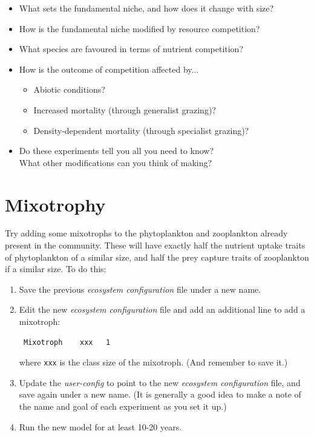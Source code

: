 \begin{itemize}
\item What sets the fundamental niche, and how does it change with size?
\item How is the fundamental niche modified by resource competition?
\item What species are favoured in terms of nutrient competition?
\item How is the outcome of competition affected by...
\begin{itemize}
\item Abiotic conditions?
\item Increased mortality (through generalist grazing)?
\item Density-dependent mortality (through specialist grazing)?
\end{itemize}
\item Do these experiments tell you all you need to know?\\What other modifications can you think of making?
\end{itemize}

\newpage

\section{Mixotrophy}

Try adding some mixotrophs to the phytoplankton and zooplankton already present in the community. These will have exactly half the nutrient uptake traits of phytoplankton of a similar size, and half the prey capture traits of zooplankton if a similar size. To do this:

\begin{enumerate}[noitemsep]
\vspace{1mm}
\item Save the previous \textit{ecosystem configuration} file under a new name.
\vspace{1mm}
\item Edit the new \textit{ecosystem configuration} file and add an additional line to add a mixotroph:
\vspace{-1mm}\small\begin{verbatim}
 Mixotroph    xxx   1
\end{verbatim}\normalsize\vspace{-1mm}
where \texttt{xxx} is the class size of the mixotroph. (And remember to save it.)
\vspace{1mm}
\item Update the \textit{user-config} to point to the new \textit{ecosystem configuration} file, and save again under a new name. (It is generally a good idea to make a note of the name and goal of each experiment as you set it up.)
\vspace{1mm}
\item Run the new model for at least 10-20 years.
\end{enumerate}
\vspace{1mm}

